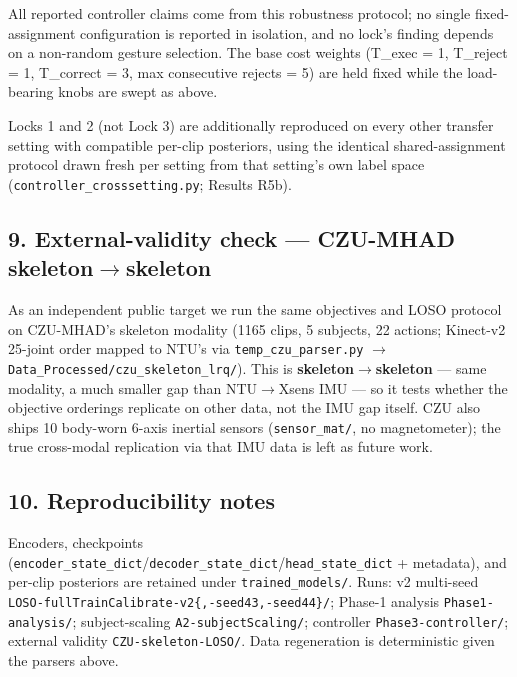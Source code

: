 All reported controller claims come from this robustness protocol; no single fixed-assignment configuration is reported in isolation, and no lock's finding depends on a non-random gesture selection. The base cost weights (T\_exec = 1, T\_reject = 1, T\_correct = 3, max consecutive rejects = 5) are held fixed while the load-bearing knobs are swept as above.

Locks 1 and 2 (not Lock 3) are additionally reproduced on every other transfer setting with compatible per-clip posteriors, using the identical shared-assignment protocol drawn fresh per setting from that setting's own label space (\texttt{controller\_crosssetting.py}; Results R5b).

\subsection{9. External-validity check --- CZU-MHAD skeleton$\rightarrow$skeleton}

As an independent public target we run the same objectives and LOSO protocol on CZU-MHAD's skeleton modality (1165 clips, 5 subjects, 22 actions; Kinect-v2 25-joint order mapped to NTU's via \texttt{temp\_czu\_parser.py} $\rightarrow$ \texttt{Data\_Processed/czu\_skeleton\_lrq/}). This is \textbf{skeleton$\rightarrow$skeleton} --- same modality, a much smaller gap than NTU$\rightarrow$Xsens IMU --- so it tests whether the objective orderings replicate on other data, not the IMU gap itself. CZU also ships 10 body-worn 6-axis inertial sensors (\texttt{sensor\_mat/}, no magnetometer); the true cross-modal replication via that IMU data is left as future work.

\subsection{10. Reproducibility notes}
Encoders, checkpoints (\texttt{encoder\_state\_dict}/\texttt{decoder\_state\_dict}/\texttt{head\_state\_dict} + metadata), and per-clip posteriors are retained under \texttt{trained\_models/}. Runs: v2 multi-seed \texttt{LOSO-fullTrainCalibrate-v2\{,-seed43,-seed44\}/}; Phase-1 analysis \texttt{Phase1-analysis/}; subject-scaling \texttt{A2-subjectScaling/}; controller \texttt{Phase3-controller/}; external validity \texttt{CZU-skeleton-LOSO/}. Data regeneration is deterministic given the parsers above.
